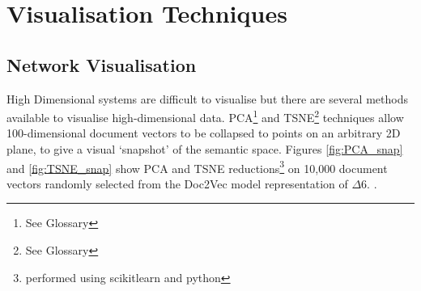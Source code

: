 \section{Visualisation Techniques}
\subsection{Network Visualisation}
High Dimensional systems are difficult to visualise but there are several methods available to visualise high-dimensional data. PCA\footnote{See Glossary} \cite{PCA} and TSNE\footnote{See Glossary}\cite{tsne1}\cite{bhtsne} techniques allow 100-dimensional document vectors to be collapsed to points on an arbitrary 2D plane, to give a visual `snapshot' of the semantic space. 
Figures \ref{fig:PCA_snap} and \ref{fig:TSNE_snap} show PCA and TSNE reductions\footnote{performed using scikitlearn and python} on 10,000 document vectors randomly selected from the Doc2Vec model representation of $\Delta6$. \cite{scikitlearn}.

